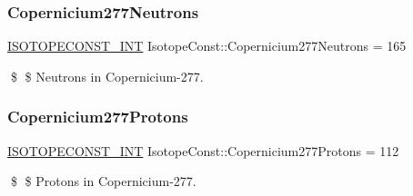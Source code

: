 \subsubsection{\texorpdfstring{Copernicium277\+Neutrons}{Copernicium277Neutrons}}
{\footnotesize\ttfamily \mbox{\hyperlink{group___isotope_const-_macros_ga5f18360b3e99483a35c32d789e62621c}{I\+S\+O\+T\+O\+P\+E\+C\+O\+N\+S\+T\+\_\+\+I\+NT}} Isotope\+Const\+::\+Copernicium277\+Neutrons = 165}

\$ \$ Neutrons in Copernicium-\/277. \mbox{\label{group___isotope_const-_copernicium-_cn277_ga99aeba44f9b0acf188a84632854be5db}} 
\subsubsection{\texorpdfstring{Copernicium277\+Protons}{Copernicium277Protons}}
{\footnotesize\ttfamily \mbox{\hyperlink{group___isotope_const-_macros_ga5f18360b3e99483a35c32d789e62621c}{I\+S\+O\+T\+O\+P\+E\+C\+O\+N\+S\+T\+\_\+\+I\+NT}} Isotope\+Const\+::\+Copernicium277\+Protons = 112}

\$ \$ Protons in Copernicium-\/277. 